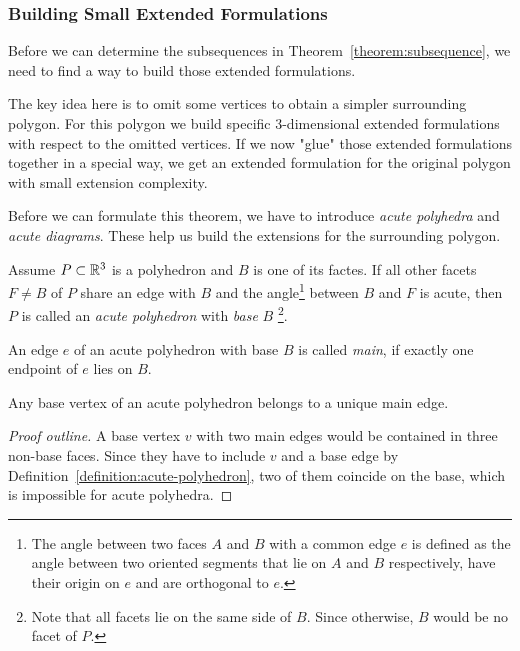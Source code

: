 \subsubsection{Building Small Extended Formulations}

Before we can determine the subsequences in Theorem~\ref{theorem:subsequence}, we need to find a way to build those extended formulations.

The key idea here is to omit some vertices to obtain a simpler surrounding polygon. For this polygon we build specific 3-dimensional extended formulations with respect to the omitted vertices. If we now "glue" those extended formulations together in a special way, we get an extended formulation for the original polygon with small extension complexity.

Before we can formulate this theorem, we have to introduce \emph{acute polyhedra} and \emph{acute diagrams}. These help us build the extensions for the surrounding polygon.

\begin{definition}\label{definition:acute-polyhedron}
  Assume $P \subset \mathbb{R}^3$ is a polyhedron and $B$ is one of its factes. If all other facets $F \neq B$ of $P$ 
  share an edge with $B$ and
  the angle\footnote{The angle between two faces $A$ and $B$ with a common edge $e$ is defined as the angle between two oriented segments that lie on $A$ and $B$ respectively, have their origin on $e$ and are orthogonal to $e$.} between $B$ and $F$ is acute,
  then $P$ is called an \emph{acute polyhedron} with \emph{base} $B$ \footnote{Note that all facets lie on the same side of $B$. Since otherwise, $B$ would be no facet of $P$.}.
\end{definition}

\begin{definition}
  An edge $e$ of an acute polyhedron with base $B$ is called \emph{main}, if exactly one endpoint of $e$ lies on $B$.
\end{definition}

\begin{lemma}
  Any base vertex of an acute polyhedron belongs to a unique main edge.
\end{lemma}

\begin{proof}[Proof outline]
  A base vertex $v$ with two main edges would be contained in three non-base faces. Since they have to include $v$ and a base edge by Definition~\ref{definition:acute-polyhedron}, two of them coincide on the base, which is impossible for acute polyhedra.
\end{proof}

